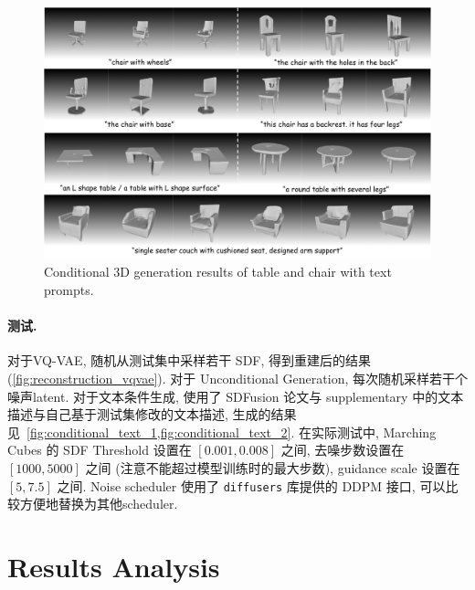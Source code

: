 \documentclass[11pt]{article}
\newcommand\1{\mathds{1}}
\begin{document}
\begin{figure}[htbp]
    \centering
    \includegraphics[width=1.0\textwidth]{imgs/result_text_2.pdf}
    \caption{Conditional 3D generation results of table and chair with text prompts.}
    \label{fig:conditional_text_1}
\end{figure}
\vspace{-1em}
\paragraph{测试.}  对于VQ-VAE, 随机从测试集中采样若干 SDF, 得到重建后的结果 (\cref{fig:reconstruction_vqvae}). 对于 Unconditional Generation, 每次随机采样若干个噪声latent. 对于文本条件生成, 
使用了 SDFusion 论文与 supplementary 中的文本描述与自己基于测试集修改的文本描述, 生成的结果见~\cref{fig:conditional_text_1,fig:conditional_text_2}.
在实际测试中, Marching Cubes 的 SDF Threshold 设置在 $[0.001, 0.008]$ 之间, 去噪步数设置在 $[1000, 5000]$ 之间 (注意不能超过模型训练时的最大步数), guidance scale 设置在 $[5, 7.5]$ 之间.
Noise scheduler 使用了 \texttt{diffusers} 库提供的 DDPM 接口, 可以比较方便地替换为其他scheduler.
\section{Results Analysis}
\end{document}
